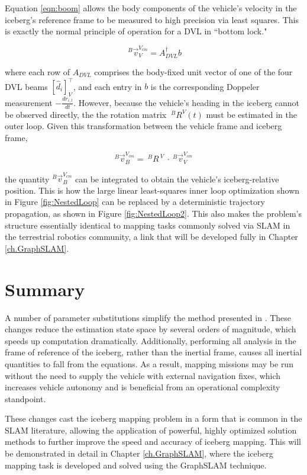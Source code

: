 Equation \ref{eqn:boom} allows the body components of the vehicle's velocity in the iceberg's reference frame to be measured to high precision via least squares. This is exactly the normal principle of operation for a DVL in ``bottom lock." 

   \begin{equation}
   ~^B\vec{v}^{V_{cm}}_V = A_{DVL}^\dagger b
   \label{eqn:LSDVL}
\end{equation}

where each row of $A_{DVL}$ comprises the body-fixed unit vector of one of the four DVL beams $\left[\hat{d}_i\right]_V^\intercal$, and each entry in $b$ is the corresponding Doppeler measurement $ -\frac{dr_{i,t}}{dt} $. However, because the vehicle's heading in the iceberg cannot be observed directly, the the rotation matrix $~^BR^{V}(t) $ must be estimated in the outer loop. Given this transformation between the vehicle frame and iceberg frame, 

   \begin{equation}
   ^B\vec{v}^{V_{cm}}_B= ~^BR^{~V}~ \cdot~^B\vec{v}^{V_{cm}}_V
   \label{eqn:boomLinAlg}
\end{equation}

the quantity $^B\vec{v}^{V_{cm}}_B$ can be integrated to obtain the vehicle's iceberg-relative position. This is how the large linear least-squares inner loop optimization shown in Figure \ref{fig:NestedLoop} can be replaced by a deterministic trajectory propagation, as shown in Figure \ref{fig:NestedLoop2}. This also makes the problem's structure essentially identical to mapping tasks commonly solved via SLAM in the terrestrial robotics community, a link that will be developed fully in Chapter \ref{ch.GraphSLAM}.

\section{Summary}

A number of parameter substitutions simplify the method presented in \cite{Kimball2011}. These changes reduce the estimation state space by several orders of magnitude, which speeds up computation dramatically. Additionally, performing all analysis in the frame of reference of the iceberg, rather than the inertial frame, causes all inertial quantities to fall from the equations. As a result, mapping missions may be run without the need to supply the vehicle with external navigation fixes, which increases vehicle autonomy and is beneficial from an operational complexity standpoint. 

These changes cast the iceberg mapping problem in a form that is common in the SLAM literature, allowing the application of powerful, highly optimized solution methods to further improve the speed and accuracy of iceberg mapping. This will be demonstrated in detail in Chapter \ref{ch.GraphSLAM}, where the iceberg mapping task is developed and solved using the GraphSLAM technique. 

